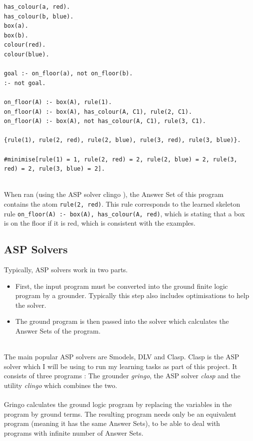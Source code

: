 \begin{lstlisting}
has_colour(a, red).
has_colour(b, blue).
box(a).
box(b).
colour(red).
colour(blue).

goal :- on_floor(a), not on_floor(b).
:- not goal.

on_floor(A) :- box(A), rule(1).
on_floor(A) :- box(A), has_colour(A, C1), rule(2, C1).
on_floor(A) :- box(A), not has_colour(A, C1), rule(3, C1).

{rule(1), rule(2, red), rule(2, blue), rule(3, red), rule(3, blue)}.

#minimise[rule(1) = 1, rule(2, red) = 2, rule(2, blue) = 2, rule(3, red) = 2, rule(3, blue) = 2].
\end{lstlisting}
\mbox{}\\
When ran (using the ASP solver clingo \cite{Gebser2007}), the Answer Set of this program contains the atom \lstinline!rule(2, red)!. This rule corresponds to the learned skeleton rule \lstinline!on_floor(A) :- box(A), has_colour(A, red)!, which is stating that a box is on the floor if it is red, which is consistent with the examples.

\subsection{ASP Solvers}

Typically, ASP solvers work in two parts.

\begin{itemize}
\item First, the input program must be converted into the ground finite logic program by a grounder. Typically this step also includes optimisations to help the solver.
\item The ground program is then passed into the solver which calculates the Answer Sets of the program.
\end{itemize}
\mbox{}\\
The main popular ASP solvers are Smodels, DLV and Clasp. Clasp \cite{Gebser2007} is the ASP solver which I will be using to run my learning tasks as part of this project. It consists of three programs : The grounder \textit{gringo}, the ASP solver \textit{clasp} and the utility \textit{clingo} which combines the two.\\ \\
Gringo calculates the ground logic program by replacing the variables in the program by ground terms. The resulting program needs only be an equivalent program (meaning it has the same Answer Sets), to be able to deal with programs with infinite number of Answer Sets.

